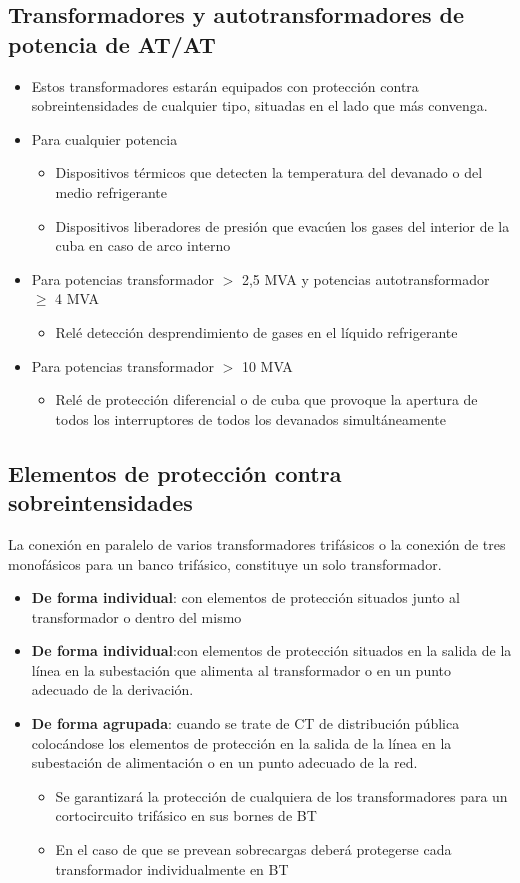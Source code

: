\subsection{Transformadores y autotransformadores de potencia de AT/AT}
\begin{itemize}
	\item Estos transformadores estarán equipados con protección contra sobreintensidades de cualquier tipo, situadas en el lado que más convenga.
	\item Para cualquier potencia
	\begin{itemize}
		\item Dispositivos térmicos que detecten la temperatura del devanado o del medio refrigerante
		\item Dispositivos liberadores de presión que evacúen los gases del interior de la cuba en caso de arco interno
	\end{itemize}
	\item Para potencias transformador $>$ 2,5 MVA y potencias autotransformador $\ge$ 4 MVA
	\begin{itemize}
		\item Relé detección desprendimiento de gases en el líquido refrigerante
	\end{itemize}
	\item Para potencias transformador $>$ 10 MVA
	\begin{itemize}
		\item Relé de protección diferencial o de cuba que provoque la apertura de todos los interruptores de todos los devanados simultáneamente
	\end{itemize}
\end{itemize}
\subsection{Elementos de protección contra sobreintensidades}
La conexión en paralelo de varios transformadores trifásicos o la conexión de tres monofásicos para un banco trifásico, constituye un solo transformador.
\begin{itemize}
	\item \textbf{De forma individual}: con elementos de protección situados junto al transformador o dentro del mismo
	\item \textbf{De forma individual}:con elementos de protección situados en la salida de la línea en la subestación que alimenta al transformador o en un punto adecuado de la derivación. 
	\item \textbf{De forma agrupada}: cuando se trate de CT de distribución pública colocándose los
	elementos de protección en la salida de la línea en la subestación de alimentación o
	en un punto adecuado de la red.
	\begin{itemize}
		\item Se garantizará la protección de cualquiera de los
		transformadores para un cortocircuito trifásico en sus
		bornes de BT
		\item En el caso de que se prevean sobrecargas deberá
		protegerse cada transformador individualmente en BT
	\end{itemize}
\end{itemize}
